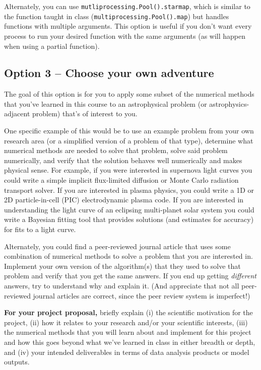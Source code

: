 \documentclass[10pt]{article}
\begin{document}
Alternately, you can use \texttt{mutliprocessing.Pool().starmap},
which is similar to the function taught in class
(\texttt{multiprocessing.Pool().map}) but handles functions with
multiple arguments. This option is useful if you don't want every
process to run your desired function with the same arguments (as will
happen when using a partial function). 

\subsection{Option 3 -- Choose your own adventure}
\label{sec:adventure}

The goal of this option is for you to apply some subset of the
numerical methods that you've learned in this course to an
astrophysical problem (or astrophysics-adjacent problem)
that's of interest to you.

One specific example of this would be to use an example problem from
your own research area (or a simplified version of a problem of that
type), determine what numerical methods are needed to solve that
problem, solve said problem numerically, and verify that the solution
behaves well numerically and makes physical sense.  For example, if
you were interested in supernova light curves you could write a simple
implicit flux-limited diffusion or Monte Carlo radiation transport
solver.  If you are interested in plasma physics, you could write a 1D
or 2D particle-in-cell (PIC) electrodynamic plasma code.  If you are
interested in understanding the light curve of an eclipsing
multi-planet solar system you could write a Bayesian fitting tool that
provides solutions (and estimates for accuracy) for fits to a light
curve.

Alternately, you could find a peer-reviewed journal article that uses
some combination of numerical methods to solve a problem that you are
interested in.  Implement your own version of the algorithm(s) that
they used to solve that problem and verify that you get the same
answers.  If you end up getting \textit{different} answers, try to
understand why and explain it.  (And appreciate that not all
peer-reviewed journal articles are correct, since the peer review
system is imperfect!)

\textbf{For your project proposal,}
briefly explain (i) the scientific motivation for the project, (ii) how
it relates to your research and/or your scientific interests, (iii) the
numerical methods that you will learn about and implement for this
project and how this goes beyond what we've learned in class in either
breadth or depth, and (iv) your intended deliverables in terms of data
analysis products or model outputs.
\end{document}
